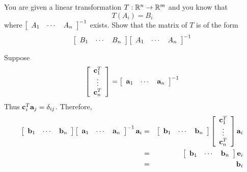 \begin{enumialphparenastyle}
\begin{ex} You are given a linear transformation $T:\mathbb{R}^{n}\rightarrow
\mathbb{R}^{m}$ and you know that
\begin{equation*}
T\left(A_{i}\right)=B_{i}
\end{equation*}
where $\left[
\begin{array}{ccc}
A_{1} & \cdots & A_{n}
\end{array}
\right] ^{-1}$ exists. Show that the matrix of $T$ is of the form
\begin{equation*}
\left[
\begin{array}{ccc}
B_{1} & \cdots & B_{n}
\end{array}
\right] \left[
\begin{array}{ccc}
A_{1} & \cdots & A_{n}
\end{array}
\right] ^{-1}
\end{equation*}
\begin{sol}
Suppose 
\[
\left[
\begin{array}{c}
{\bf c}_{1}^{T} \\
\vdots \\
{\bf c}_{n}^{T}
\end{array}
\right] =\left[
\begin{array}{ccc}
{\bf a}_{1} & \cdots & {\bf a}_{n}
\end{array}
\right]^{-1}
\]
Thus ${\bf c}_{i}^{T}{\bf a}_{j}=\delta _{ij}$. Therefore,
\begin{eqnarray*}
\left[
\begin{array}{ccc}
{\bf b}_{1} & \cdots & {\bf b}_{n}
\end{array}
\right] \left[
\begin{array}{ccc}
{\bf a}_{1} & \cdots & {\bf a}_{n}
\end{array}
\right] ^{-1}{\bf a}_{i} &=&
\left[
\begin{array}{ccc}
{\bf b}_{1} & \cdots & {\bf b}_{n}
\end{array}
\right] \left[
\begin{array}{c}
{\bf c}_{1}^{T} \\
\vdots \\
{\bf c}_{n}^{T}
\end{array}
\right] {\bf a}_{i} \\
&=&\left[
\begin{array}{ccc}
{\bf b}_{1} & \cdots & {\bf b}_{n}
\end{array}
\right] {\bf e}_{i} \\
&=&{\bf b}_{i}
\end{eqnarray*}

\end{sol}
\end{ex}
\end{enumialphparenastyle}
